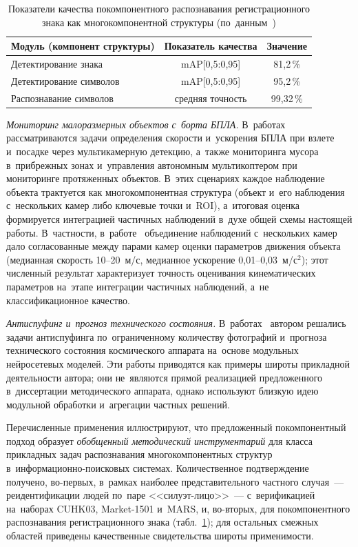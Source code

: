 \begin{table}[htbp]
\centering
\caption{Показатели качества покомпонентного распознавания
регистрационного знака как многокомпонентной структуры
(по~данным~\cite{Rusakov2020license})}
\label{tab:ch3/scal-lp}
\begin{tabular}{lcc}
\hline
Модуль (компонент структуры) & Показатель качества & Значение \\
\hline
Детектирование знака      & mAP[0,5:0,95]    & 81,2\,\%  \\
Детектирование символов   & mAP[0,5:0,95]    & 95,2\,\%  \\
Распознавание символов    & средняя точность & 99,32\,\% \\
\hline
\end{tabular}
\end{table}

\textit{Мониторинг малоразмерных объектов с~борта БПЛА.}
В~работах~\cite{Rusakov2023uavspeed,Rusakov2024marine,Rusakov2021multicopter}
рассматриваются задачи определения скорости и~ускорения БПЛА при
взлете и~посадке через мультикамерную детекцию, а~также мониторинга
мусора в~прибрежных зонах и~управления автономным мультикоптером
при мониторинге протяженных объектов. В~этих сценариях каждое
наблюдение объекта трактуется как многокомпонентная структура (объект
и~его наблюдения с~нескольких камер либо ключевые точки и~ROI),
а~итоговая оценка формируется интеграцией частичных наблюдений в~духе
общей схемы настоящей работы. В~частности, в~работе~\cite{Rusakov2023uavspeed}
объединение наблюдений с~нескольких камер дало согласованные между
парами камер оценки параметров движения объекта (медианная скорость
10--20~м/с, медианное ускорение 0,01--0,03~м/с$^2$); этот численный
результат характеризует точность оценивания кинематических параметров
на~этапе интеграции частичных наблюдений, а~не классификационное
качество.

\textit{Антиспуфинг и~прогноз технического состояния.} В~работах~\cite{Rusakov2020antispoofing,Rusakov2017spacecraft}
автором решались задачи антиспуфинга по~ограниченному количеству
фотографий и~прогноза технического состояния космического аппарата
на~основе модульных нейросетевых моделей. Эти работы приводятся как
примеры широты прикладной деятельности автора; они не~являются прямой
реализацией предложенного в~диссертации методического аппарата, однако
используют близкую идею модульной обработки и~агрегации частных
решений.

Перечисленные применения иллюстрируют, что предложенный
покомпонентный подход образует \emph{обобщенный методический
инструментарий} для класса прикладных задач распознавания
многокомпонентных структур в~информационно-поисковых системах.
Количественное подтверждение получено, во-первых, в~рамках наиболее
представительного частного случая~--- реидентификации людей по~паре
<<силуэт-лицо>>~--- с~верификацией на~наборах CUHK03, Market-1501
и~MARS, и, во-вторых, для покомпонентного распознавания
регистрационного знака (табл.~\ref{tab:ch3/scal-lp}); для остальных
смежных областей приведены качественные свидетельства широты
применимости.

